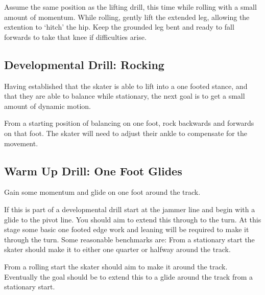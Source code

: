 Assume the same position as the lifting drill, this time while rolling with a small amount of momentum. 
While rolling, gently lift the extended leg, allowing the extention to `hitch' the hip.
Keep the grounded leg bent and ready to fall forwards to take that knee if difficulties arise.  


\subsection*{Developmental Drill: Rocking}

Having established that the skater is able to lift into a one footed stance, and that they are able to balance while stationary, the next goal is to get a small amount of dynamic motion. 

From a starting position of balancing on one foot, rock backwards and forwards on that foot. 
The skater will need to adjust their ankle to compensate for the movement.


\subsection*{Warm Up Drill: One Foot Glides} 

Gain some momentum and glide on one foot around the track. 

If this is part of a developmental drill start at the jammer line and begin with a glide to the pivot line. 
You should aim to extend this through to the turn. 
At this stage some basic one footed edge work and leaning will be required to make it through the turn.   
Some reasonable benchmarks are: From a stationary start the skater should make it to either one quarter or halfway around the track. 

From a rolling start the skater should aim to make it around the track.
Eventually the goal should be to extend this to a glide around the track from a stationary start. 

